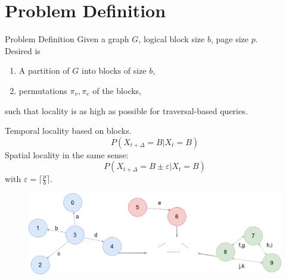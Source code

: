 \documentclass[rgb]{beamer}
\begin{document}
    \section{Problem Definition}
        \begin{frame}[allowframebreaks]{Problem Definition}
            Given a graph $G$, logical block size $b$, page size $p$. \\ [2em]
            Desired is \\ [1em]
            \begin{enumerate}
            \item A partition of $G$ into blocks of size $b$, \\ [1em]
            \item permutations $\pi_v, \pi_e$ of the blocks,\\ [1.5em]
            \end{enumerate}
            such that locality is as high as possible for traversal-based queries.
            
            \framebreak
            
            Temporal locality based on blocks.
                \[ P (X_{t + \Delta} = B | X_t = B) \]
            Spatial locality in the same sense:
                \[ P(X_{t + \Delta} = B \pm \varepsilon | X_t = B) \]
                with $\varepsilon = \lceil \frac{p}{b} \rceil$.
          
            \framebreak
            \begin{figure}[htp]
                \begin{center}
                    \includegraphics[keepaspectratio,height=0.4\textheight,width=\textwidth]{img/example_graph.png}
                \end{center}
            \end{figure}
            

\end{frame}
\end{document}
